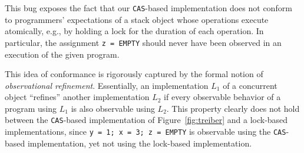 This bug exposes the fact that our {\tt CAS}-based implementation does not
conform to programmers' expectations of a stack object whose operations execute
atomically, e.g., by holding a lock for the duration of each operation.
In particular, the assignment {\tt z = EMPTY} should never have
been observed in an execution of the given program. 

This idea of conformance is rigorously captured by the formal notion of
\emph{observational refinement}. Essentially, an implementation $L_1$ of a
concurrent object ``refines'' another implementation $L_2$ if every observable
behavior of a program using $L_1$ is also observable using $L_2$. This property
clearly does not hold between the {\tt CAS}-based implementation of
Figure~\ref{fig:treiber} and a lock-based implementations, since {\tt y = 1; x
= 3; z = EMPTY} is observable using the {\tt CAS}-based implementation, yet not
using the lock-based implementation.
